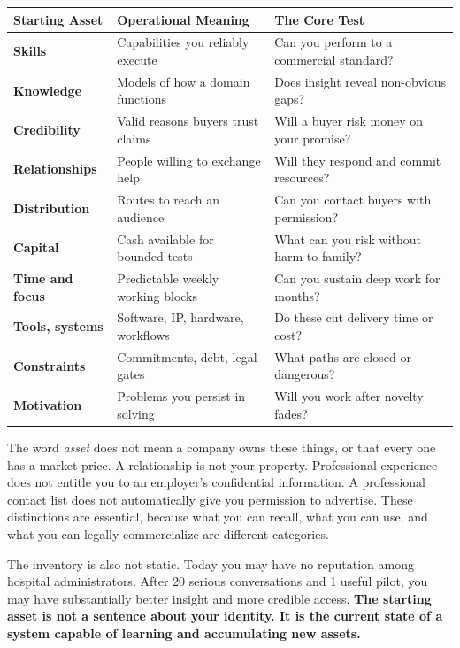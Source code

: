 \begin{tcolorbox}[
  enhanced,
  colback=white,
  colframe=BayesBorder!80!white,
  boxrule=0.4pt,
  arc=2pt,
  left=3pt,right=3pt,top=3pt,bottom=3pt,
  before skip=3pt,after skip=5pt
]
\scriptsize
\setlength{\tabcolsep}{2.5pt}
\renewcommand{\arraystretch}{1.15}
\begin{tabularx}{\linewidth}{@{} >{\bfseries\color{BayesInk}}p{1.9cm} >{\color{BayesInk}}X >{\color{BayesSecondary}}X @{}}
\toprule
\textbf{Starting Asset} & \textbf{Operational Meaning} & \textbf{The Core Test} \\
\midrule
Skills & Capabilities you reliably execute & Can you perform to a commercial standard? \\
Knowledge & Models of how a domain functions & Does insight reveal non-obvious gaps? \\
Credibility & Valid reasons buyers trust claims & Will a buyer risk money on your promise? \\
Relationships & People willing to exchange help & Will they respond and commit resources? \\
Distribution & Routes to reach an audience & Can you contact buyers with permission? \\
Capital & Cash available for bounded tests & What can you risk without harm to family? \\
Time and focus & Predictable weekly working blocks & Can you sustain deep work for months? \\
Tools, systems & Software, IP, hardware, workflows & Do these cut delivery time or cost? \\
Constraints & Commitments, debt, legal gates & What paths are closed or dangerous? \\
Motivation & Problems you persist in solving & Will you work after novelty fades? \\
\bottomrule
\end{tabularx}
\end{tcolorbox}

The word \textit{asset} does not mean a company owns these things, or that every one has a market price. A relationship is not your property. Professional experience does not entitle you to an employer's confidential information. A professional contact list does not automatically give you permission to advertise. These distinctions are essential, because what you can recall, what you can use, and what you can legally commercialize are different categories.

The inventory is also not static. Today you may have no reputation among hospital administrators. After 20 serious conversations and 1 useful pilot, you may have substantially better insight and more credible access. \textbf{The starting asset is not a sentence about your identity. It is the current state of a system capable of learning and accumulating new assets.}

